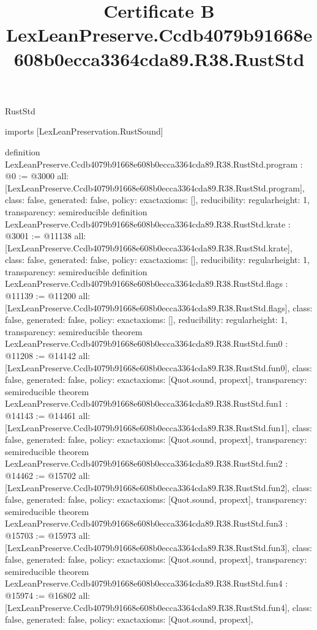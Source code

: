 \begin{lexlean}{RustStd}
\title{Certificate B LexLeanPreserve.Ccdb4079b91668e608b0ecca3364cda89.R38.RustStd}
\begin{coremodule}
imports [LexLeanPreservation.RustSound]

definition LexLeanPreserve.Ccdb4079b91668e608b0ecca3364cda89.R38.RustStd.program : @0 := @3000 {
  all: [LexLeanPreserve.Ccdb4079b91668e608b0ecca3364cda89.R38.RustStd.program],
  class: false,
  generated: false,
  policy: exact{axioms: []},
  reducibility: regular{height: 1},
  transparency: semireducible
}
definition LexLeanPreserve.Ccdb4079b91668e608b0ecca3364cda89.R38.RustStd.krate : @3001 := @11138 {
  all: [LexLeanPreserve.Ccdb4079b91668e608b0ecca3364cda89.R38.RustStd.krate],
  class: false,
  generated: false,
  policy: exact{axioms: []},
  reducibility: regular{height: 1},
  transparency: semireducible
}
definition LexLeanPreserve.Ccdb4079b91668e608b0ecca3364cda89.R38.RustStd.flags : @11139 := @11200 {
  all: [LexLeanPreserve.Ccdb4079b91668e608b0ecca3364cda89.R38.RustStd.flags],
  class: false,
  generated: false,
  policy: exact{axioms: []},
  reducibility: regular{height: 1},
  transparency: semireducible
}
theorem LexLeanPreserve.Ccdb4079b91668e608b0ecca3364cda89.R38.RustStd.fun0 : @11208 := @14142 {
  all: [LexLeanPreserve.Ccdb4079b91668e608b0ecca3364cda89.R38.RustStd.fun0],
  class: false,
  generated: false,
  policy: exact{axioms: [Quot.sound, propext]},
  transparency: semireducible
}
theorem LexLeanPreserve.Ccdb4079b91668e608b0ecca3364cda89.R38.RustStd.fun1 : @14143 := @14461 {
  all: [LexLeanPreserve.Ccdb4079b91668e608b0ecca3364cda89.R38.RustStd.fun1],
  class: false,
  generated: false,
  policy: exact{axioms: [Quot.sound, propext]},
  transparency: semireducible
}
theorem LexLeanPreserve.Ccdb4079b91668e608b0ecca3364cda89.R38.RustStd.fun2 : @14462 := @15702 {
  all: [LexLeanPreserve.Ccdb4079b91668e608b0ecca3364cda89.R38.RustStd.fun2],
  class: false,
  generated: false,
  policy: exact{axioms: [Quot.sound, propext]},
  transparency: semireducible
}
theorem LexLeanPreserve.Ccdb4079b91668e608b0ecca3364cda89.R38.RustStd.fun3 : @15703 := @15973 {
  all: [LexLeanPreserve.Ccdb4079b91668e608b0ecca3364cda89.R38.RustStd.fun3],
  class: false,
  generated: false,
  policy: exact{axioms: [Quot.sound, propext]},
  transparency: semireducible
}
theorem LexLeanPreserve.Ccdb4079b91668e608b0ecca3364cda89.R38.RustStd.fun4 : @15974 := @16802 {
  all: [LexLeanPreserve.Ccdb4079b91668e608b0ecca3364cda89.R38.RustStd.fun4],
  class: false,
  generated: false,
  policy: exact{axioms: [Quot.sound, propext]},
}
\end{coremodule}
\end{lexlean}
